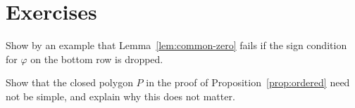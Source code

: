 
\section*{Exercises}

\begin{exercise}
Show by an example that Lemma~\ref{lem:common-zero} fails if the sign condition for $\varphi$ on the bottom row is dropped.
\end{exercise}

\begin{exercise}
Show that the closed polygon $P$ in the proof of Proposition~\ref{prop:ordered} need not be simple, and explain why this does not matter.
\end{exercise}
